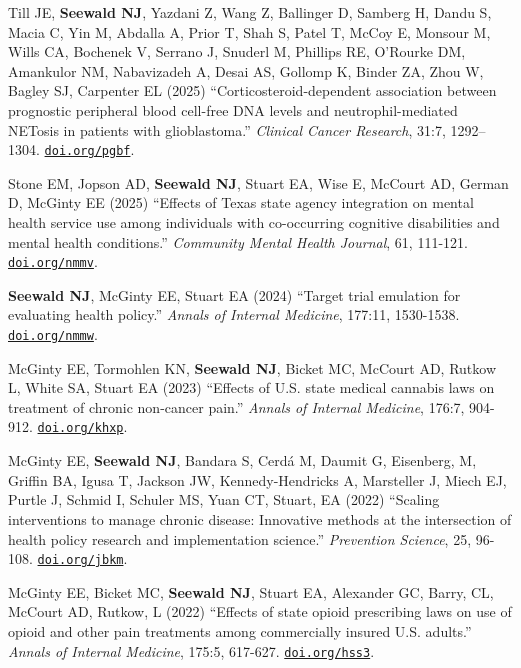 \documentclass[letterpaper,11pt]{article} %
\begin{document}
\begin{etaremune}
        \item Till JE, \textbf{Seewald NJ}, Yazdani Z, Wang Z, Ballinger D, Samberg H, Dandu S, Macia C, Yin M, Abdalla A, Prior T, Shah S, Patel T, McCoy E, Monsour M, Wills CA, Bochenek V, Serrano J, Snuderl M, Phillips RE, O'Rourke DM, Amankulor NM, Nabavizadeh A, Desai AS, Gollomp K, Binder ZA, Zhou W, Bagley SJ, Carpenter EL (2025) ``Corticosteroid-dependent association between prognostic peripheral blood cell-free DNA levels and neutrophil-mediated NETosis in patients with glioblastoma.'' \textit{Clinical Cancer Research}, 31:7, 1292–1304. \href{https://doi.org/pgbf}{\texttt{doi.org/pgbf}}.

        \item Stone EM, Jopson AD, \textbf{Seewald NJ}, Stuart EA, Wise E, McCourt AD, German D, McGinty EE (2025) ``Effects of Texas state agency integration on mental health service use among individuals with co-occurring cognitive disabilities and mental health conditions.'' \textit{Community Mental Health Journal}, 61, 111-121. \href{https://doi.org/nmmv}{\texttt{doi.org/nmmv}}.
        
		\item \textbf{Seewald NJ}, McGinty EE, Stuart EA (2024) ``Target trial emulation for evaluating health policy.'' \textit{Annals of Internal Medicine}, 177:11, 1530-1538. \href{https://doi.org/nmmw}{\texttt{doi.org/nmmw}}.
		
		\item McGinty EE, Tormohlen KN, \textbf{Seewald NJ}, Bicket MC, McCourt AD, Rutkow L, White SA, Stuart EA (2023) ``Effects of U.S. state medical cannabis laws on treatment of chronic non-cancer pain.'' \textit{Annals of Internal Medicine}, 176:7, 904-912. \href{https://doi.org/khxp}{\texttt{doi.org/khxp}}.
		
		\item McGinty EE, \textbf{Seewald NJ}, Bandara S, Cerd\'{a} M, Daumit G, Eisenberg, M, Griffin BA, Igusa T, Jackson JW, Kennedy-Hendricks A, Marsteller J, Miech EJ, Purtle J, Schmid I, Schuler MS, Yuan CT, Stuart, EA (2022) ``Scaling interventions to manage chronic disease: Innovative methods at the intersection of health policy research and implementation science.'' \textit{Prevention Science}, 25, 96-108. \href{https://doi.org/jbkm}{\texttt{doi.org/jbkm}}.
		
		\item McGinty EE, Bicket MC, \textbf{Seewald NJ}, Stuart EA, Alexander GC, Barry, CL, McCourt AD, Rutkow, L (2022) ``Effects of state opioid prescribing laws on use of opioid and other pain treatments among commercially insured U.S. adults.'' \textit{Annals of Internal Medicine}, 175:5, 617-627. \href{https://doi.org/hss3}{\texttt{doi.org/hss3}}.
		

\end{etaremune}
\end{document}
